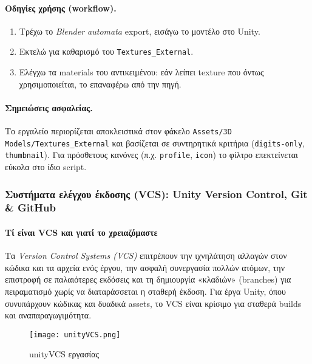 \paragraph{Οδηγίες χρήσης (workflow).}
\begin{enumerate}
  \item Τρέχω το \emph{Blender automata} export, εισάγω το μοντέλο στο Unity.
  \item Εκτελώ  για καθαρισμό του \texttt{Textures\_External}. 
  \item Ελέγχω τα materials του αντικειμένου: εάν λείπει texture που όντως χρησιμοποιείται, το επαναφέρω από την πηγή.
\end{enumerate}

\paragraph{Σημειώσεις ασφαλείας.}
Το εργαλείο περιορίζεται αποκλειστικά στον φάκελο \texttt{Assets/3D Models/Textures\_External} και βασίζεται σε συντηρητικά κριτήρια (\texttt{digits-only}, \texttt{thumbnail}). Για πρόσθετους κανόνες (π.χ. \texttt{profile}, \texttt{icon}) το φίλτρο επεκτείνεται εύκολα στο ίδιο script.

\subsubsection{Συστήματα ελέγχου έκδοσης (VCS): Unity Version Control, Git \& GitHub}

\paragraph*{Τί είναι VCS και γιατί το χρειαζόμαστε}
Τα \textit{Version Control Systems (VCS)} επιτρέπουν την ιχνηλάτηση αλλαγών στον κώδικα και τα αρχεία ενός έργου, την ασφαλή συνεργασία πολλών ατόμων, την επιστροφή σε παλαιότερες εκδόσεις και τη δημιουργία «κλαδιών» (branches) για πειραματισμό χωρίς να διαταράσσεται η σταθερή έκδοση. Για έργα Unity, όπου συνυπάρχουν κώδικας και δυαδικά assets, το VCS είναι κρίσιμο για σταθερά builds και αναπαραγωγιμότητα.

\begin{figure}[H]
    \centering
    \texttt{[image: unityVCS.png]}
    \caption{unityVCS εργασίας}
    \label{fig:placeholder}
\end{figure}

